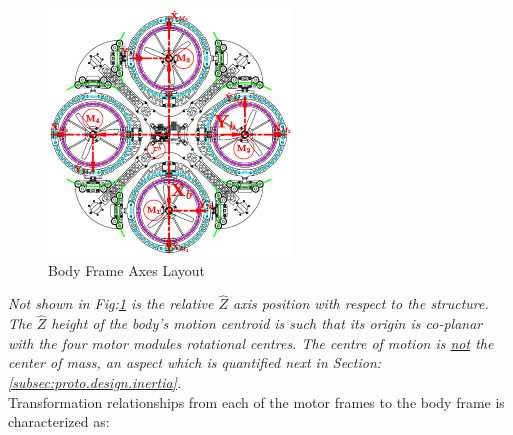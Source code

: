 \begin{figure}[htbp]
\centering
\includegraphics[width=\textwidth]{figs/body-frame}
\caption{Body Frame Axes Layout}
\label{fig:body-frame}
\end{figure}
\par
\emph{\color{Gray}Not shown in Fig:\ref{fig:body-frame} is the relative $\hat{Z}$ axis position with respect to the structure. The $\hat{Z}$ height of the body's motion centroid is such that its origin is co-planar with the four motor modules rotational centres. The centre of motion is \underline{not} the center of mass, an aspect which is quantified next in Section:\ref{subsec:proto.design.inertia}.}
\\
Transformation relationships from each of the motor frames to the body frame is characterized as:
